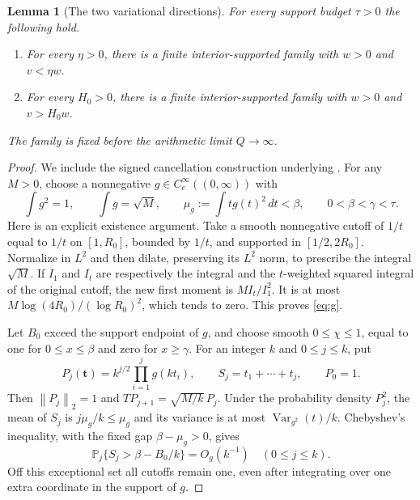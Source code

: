 \documentclass[11pt]{article}
\newtheorem{lemma}[theorem]{Lemma}
\theoremstyle{remark}
\numberwithin{equation}{section}
\newcommand{\PP}{\mathbb P}
\newcommand{\norm}[1]{\left\lVert#1\right\rVert}
\begin{document}
\begin{lemma}[The two variational directions]\label{lem:variational}
For every support budget $\tau>0$ the following hold.
\begin{enumerate}[label=(\roman*)]
 \item For every $\eta>0$, there is a finite interior-supported
 family with $w>0$ and $v<\eta w$.
 \item For every $H_0>0$, there is a finite interior-supported
 family with $w>0$ and $v>H_0w$.
\end{enumerate}
The family is fixed before the arithmetic limit $Q\to\infty$.
\end{lemma}
\begin{proof}
We include the signed cancellation construction underlying
\cite{OAI,Meiji119}.
For any $M>0$, choose a nonnegative
$g\in C_c^\infty((0,\infty))$ with
\begin{equation}\label{eq:g}
 \int g^2=1,\qquad \int g=\sqrt M,\qquad
 \mu_g:=\int t g(t)^2\,dt<\beta,
 \qquad 0<\beta<\gamma<\tau.
\end{equation}
Here is an explicit existence argument.
Take a smooth nonnegative cutoff of $1/t$ equal to $1/t$ on
$[1,R_0]$, bounded by $1/t$, and supported in $[1/2,2R_0]$.
Normalize in $L^2$ and then dilate, preserving its $L^2$ norm,
to prescribe the integral $\sqrt M$.
If $I_1$ and $I_t$ are respectively the integral and the
$t$-weighted squared integral of the original cutoff, the
new first moment is $MI_t/I_1^2$.
It is at most
$M\log(4R_0)/(\log R_0)^2$, which tends to zero.
This proves \eqref{eq:g}.

Let $B_0$ exceed the support endpoint of $g$, and choose smooth
$0\le\chi\le1$, equal to one for $0\le x\le\beta$ and zero
for $x\ge\gamma$. For an integer $k$ and $0\le j\le k$, put
\[
 P_j(\mathbf t)=k^{j/2}\prod_{i=1}^j g(kt_i),
 \qquad S_j=t_1+\cdots+t_j,\qquad P_0=1.
\]
Then $\norm{P_j}_2=1$ and
$TP_{j+1}=\sqrt{M/k}\,P_j$.
Under the probability density $P_j^2$, the mean of $S_j$
is $j\mu_g/k\le\mu_g$ and its variance is at most
$\operatorname{Var}_{g^2}(t)/k$.
Chebyshev's inequality, with the fixed gap $\beta-\mu_g>0$,
gives
\begin{equation}\label{eq:cutoffexception}
 \PP_j\{S_j>\beta-B_0/k\}=O_g(k^{-1})
 \quad(0\le j\le k).
\end{equation}
Off this exceptional set all cutoffs remain one, even after
integrating over one extra coordinate in the support of $g$.


\end{proof}
\end{document}
